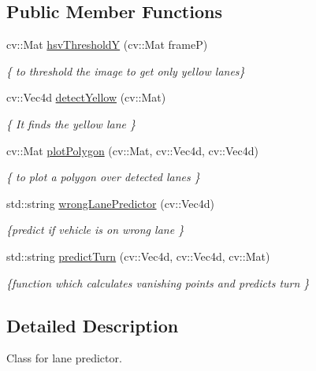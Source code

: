 \subsection*{Public Member Functions}
\begin{DoxyCompactItemize}
\item 
cv\+::\+Mat \hyperlink{classLanePredictor_ada11760da395c1d2f9e6117212659742}{hsv\+ThresholdY} (cv\+::\+Mat frameP)
\begin{DoxyCompactList}\small\item\em \{ to threshold the image to get only yellow lanes\} \end{DoxyCompactList}\item 
cv\+::\+Vec4d \hyperlink{classLanePredictor_a2ab03a2ebd0cca2c27a5773533f16dd3}{detect\+Yellow} (cv\+::\+Mat)
\begin{DoxyCompactList}\small\item\em \{ It finds the yellow lane \} \end{DoxyCompactList}\item 
cv\+::\+Mat \hyperlink{classLanePredictor_ab793993ceb4f18d3fcd2b57779fef859}{plot\+Polygon} (cv\+::\+Mat, cv\+::\+Vec4d, cv\+::\+Vec4d)
\begin{DoxyCompactList}\small\item\em \{ to plot a polygon over detected lanes \} \end{DoxyCompactList}\item 
std\+::string \hyperlink{classLanePredictor_ac930fa52cdede9afa25bbf7cafd8c6b5}{wrong\+Lane\+Predictor} (cv\+::\+Vec4d)
\begin{DoxyCompactList}\small\item\em \{predict if vehicle is on wrong lane \} \end{DoxyCompactList}\item 
std\+::string \hyperlink{classLanePredictor_a9b72c2dfa77992f7f8e229c3a67103f7}{predict\+Turn} (cv\+::\+Vec4d, cv\+::\+Vec4d, cv\+::\+Mat)
\begin{DoxyCompactList}\small\item\em \{function which calculates vanishing points and predicts turn \} \end{DoxyCompactList}\end{DoxyCompactItemize}


\subsection{Detailed Description}
Class for lane predictor. 

